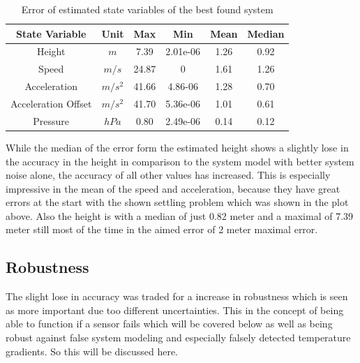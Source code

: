 \begin{table}[h!]
\centering
\begin{tabular}{cccccc}
\hline
\multicolumn{1}{|c|}{State Variable} & \multicolumn{1}{c|}{Unit} & \multicolumn{1}{c|}{Max} & \multicolumn{1}{c|}{Min} & \multicolumn{1}{c|}{Mean} & \multicolumn{1}{c|}{Median} \\ \hline
Height                            & $m$                         & 7.39	                  & 2.01e-06                 & 1.26                    & 0.92                      \\
Speed                             & $m/s$                       & 24.87                   & 0                        & 1.61                    & 1.26                      \\
Acceleration                       & $m/s^2$   			& 41.66                   & 4.86-06                  & 1.28                    & 0.70                     \\
Acceleration Offset                & $m/s^2$   			& 41.70                   & 5.36e-06                 & 1.01                    & 0.61                     \\
Pressure		          & $hPa$   			& 0.80                    & 2.49e-06                 & 0.14                    & 0.12 
\end{tabular}
\caption{Error of estimated state variables of the best found system}
\label{tab:ErrorBestPerformanceSystem}
\end{table}

While the median of the error form the estimated height shows a slightly lose in the accuracy in the height in comparison to the system model with better system noise alone,
the accuracy of all other values has increased.
This is especially impressive in the mean of the speed and acceleration, because they have great errors at the start with the shown settling problem which was shown in the plot above. 
Also the height is with a median of just 0.82 meter and a maximal of 7.39 meter still most of the time in the aimed error of 2 meter maximal error.

\subsection{Robustness}
The slight lose in accuracy was traded for a increase in robustness which is seen as more important due too different uncertainties.
This in the concept of being able to function if a sensor fails which will be covered below as well as being robust against false system modeling 
and especially falsely detected temperature gradients. So this will be discussed here.

